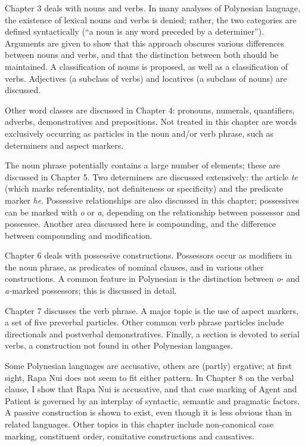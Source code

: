 Chapter 3 deals with nouns and verbs. In many analyses of Polynesian language, the existence of lexical nouns and verbs is denied; rather, the two categories are defined syntactically (“a noun is any word preceded by a determiner”). Arguments are given to show that this approach obscures various differences between nouns and verbs, and that the distinction between both should be maintained. A classification of nouns is proposed, as well as a classification of verbs. Adjectives (a subclass of verbs) and locatives (a subclass of nouns) are discussed.

Other word classes are discussed in Chapter 4: pronouns, numerals, quantifiers, adverbs, demonstratives and prepositions. Not treated in this chapter are words exclusively occurring as particles in the noun and/or verb phrase, such as determiners and aspect markers.

The noun phrase potentially contains a large number of elements; these are discussed in Chapter 5. Two determiners are discussed extensively: the article \textit{te} (which marks referentiality, not definiteness or specificity) and the predicate marker \textit{he}. Possessive relationships are also discussed in this chapter; possessives can be marked with \textit{o} or \textit{a}, depending on the relationship between possessor and possessee. Another area discussed here is compounding, and the difference between compounding and modification.

Chapter 6 deals with possessive constructions. Possessors occur as modifiers in the noun phrase, as predicates of nominal clauses, and in various other constructions. A common feature in Polynesian is the distinction between \textit{o}{}- and \textit{a-}marked possessors; this is discussed in detail.

Chapter 7 discusses the verb phrase. A major topic is the use of aspect markers, a set of five preverbal particles. Other common verb phrase particles include directionals and postverbal demonstratives. Finally, a section is devoted to serial verbs, a construction not found in other Polynesian languages.

Some Polynesian languages are accusative, others are (partly) ergative; at first sight, Rapa Nui does not seem to fit either pattern. In Chapter 8 on the verbal clause, I show that Rapa Nui is accusative, and that case marking of Agent and Patient is governed by an interplay of syntactic, semantic and pragmatic factors. A passive construction is shown to exist, even though it is less obvious than in related languages. Other topics in this chapter include non-canonical case marking, constituent order, comitative constructions and causatives.


